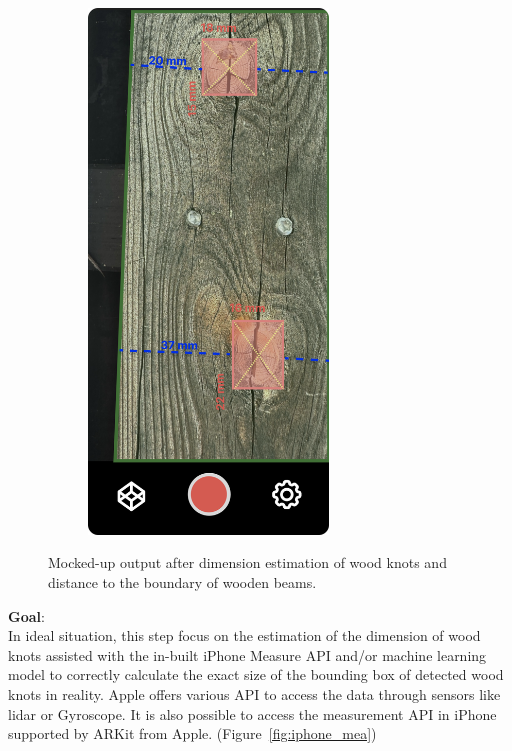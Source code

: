 \begin{figure}[ht]
\begin{subfigure}[b]{0.3\textwidth}
        \includegraphics[width=0.7\textwidth]{Master Thesis/Images/Section_3/Mock/3-Mock5.png}
    \end{subfigure}
  \caption{Mocked-up output after dimension estimation of wood knots and distance to the boundary of wooden beams.}   
    \label{fig:mock3}
\end{figure}  


\textbf{Goal}:\\

In ideal situation, this step focus on the estimation of the dimension of wood knots assisted with the in-built iPhone Measure API and/or machine learning model to correctly calculate the exact size of the bounding box of detected wood knots in reality. Apple offers various API to access the data through sensors like lidar or Gyroscope. It is also possible to access the measurement API in iPhone supported by ARKit from Apple. (Figure~\ref{fig:iphone_mea})

